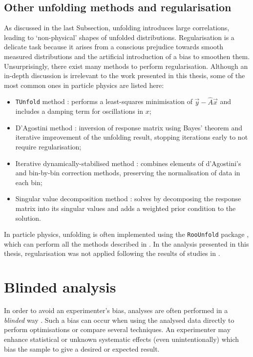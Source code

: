 \subsection{Other unfolding methods and regularisation}
As discussed in the last Subsection, unfolding introduces large correlations, leading to `non-physical' shapes of unfolded distributions.
Regularisation is a delicate task because it arises from a conscious prejudice towards smooth measured distributions and the artificial introduction of a bias to smoothen them.
Unsurprisingly, there exist many methods to perform regularisation.
Although an in-depth discussion is irrelevant to the work presented in this thesis, some of the most common ones in particle physics are listed here:
\begin{itemize}
    \item \texttt{TUnfold} method \cite{Schmitt:2012kp}: performs a least-squares minimisation of $\vec{y}-\hat{A}{\vec{x}}$ and includes a damping term for oscillations in $x$;
    \item D'Agostini method \cite{d2010improved,DAgostini:1994fjx}: inversion of response matrix using Bayes' theorem and iterative improvement of the unfolding result, stopping iterations early to not require regularisation;
    \item Iterative dynamically-stabilised method \cite{Malaescu:2009dm}: combines elements of d'Agostini's and bin-by-bin correction methods, preserving the normalisation of data in each bin;
    \item Singular value decomposition method \cite{Hocker:1995kb}: solves  by decomposing the response matrix into its singular values and adds a weighted prior condition to the solution.
\end{itemize}
In particle physics, unfolding is often implemented using the \texttt{RooUnfold} package \cite{Brenner:2019lmf}, which can perform all the methods described in .
In the analysis presented in this thesis, regularisation was not applied following the results of studies in .

\section{Blinded analysis}\label{sec:blinding}

In order to avoid an experimenter's bias, analyses are often performed in a \textit{blinded} way \cite{Roodman:2003rw}.
Such a bias can occur when using the analysed data directly to perform optimisations or compare several techniques.
An experimenter may enhance statistical or unknown systematic effects (even unintentionally) which bias the sample to give a desired or expected result.

